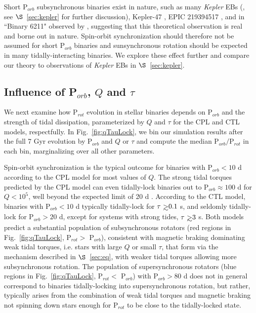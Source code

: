 \documentclass[twocolumn]{aastex61}
\def\gsim{~\rlap{$>$}{\lower 1.0ex\hbox{$\sim$}}}
\newcommand{\kepler}[0]{\textit{Kepler}\xspace}
\begin{document}
Short P$_{orb}$ subsynchronous binaries exist in nature, such as many \kepler EBs (\citet{Lurie2017}, see $\S$~\ref{sec:kepler} for further discussion), Kepler-47 \citep{Orosz2012}, EPIC 219394517 \citep{Torres2018}, and in ``Binary 6211" observed by \citet{Meibom2006}, suggesting that this theoretical observation is real and borne out in nature. Spin-orbit synchronization should therefore not be assumed for short P$_{orb}$ binaries and sunsynchronous rotation should be expected in many tidally-interacting binaries.  We explore these effect further and compare our theory to observations of \kepler EBs in $\S$~\ref{sec:kepler}.

\subsection{Influence of P$_{orb}$, $Q$ and $\tau$} \label{sec:qTauMaps}

We next examine how P$_{rot}$ evolution in stellar binaries depends on P$_{orb}$ and the strength of tidal dissipation, parameterized by $Q$ and $\tau$ for the CPL and CTL models, respectfully. In Fig.~\ref{fig:qTauLock}, we bin our simulation results after the full 7 Gyr evolution by P$_{orb}$ and $Q$ or $\tau$ and compute the median P$_{orb}/$P$_{rot}$ in each bin, marginalizing over all other parameters.

Spin-orbit synchronization is the typical outcome for binaries with P$_{orb} < 10$ d according to the CPL model for most values of $Q$. The strong tidal torques predicted by the CPL model can even tidally-lock binaries out to P$_{orb} \approx 100 $ d for $Q < 10^5$, well beyond the expected limit of 20 d \citep{Meibom2006}.  According to the CTL model, binaries with P$_{orb} < 10$ d typically tidally-lock for $\tau \gsim 0.1$ s, and seldomly tidally-lock for P$_{orb} > 20$ d, except for systems with strong tides, $\tau \gsim 3$ s.  Both models predict a substantial population of subsynchronous rotators (red regions in Fig.~\ref{fig:qTauLock}, P$_{rot} >$ P$_{orb}$), consistent with magnetic braking dominating weak tidal torques, i.e. stars with large $Q$ or small $\tau$, that form via the mechanism described in $\S$~\ref{sec:eq}, with weaker tidal torques allowing more subsynchronous rotation.  The population of supersynchronous rotators (blue regions in Fig.~\ref{fig:qTauLock}, P$_{rot} <$ P$_{orb}$) with P$_{orb} > 80$ d does not in general correspond to binaries tidally-locking into supersynchronous rotation, but rather, typically arises from the combination of weak tidal torques and magnetic braking not spinning down stars enough for P$_{rot}$ to be close to the tidally-locked state.  
\end{document}
